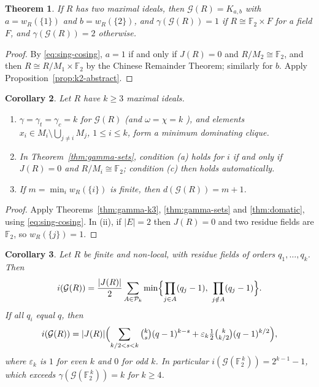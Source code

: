\documentclass[11pt]{amsart}
\newtheorem{theorem}{Theorem}[section]
\newtheorem{corollary}[theorem]{Corollary}
\theoremstyle{definition}
\theoremstyle{remark}
\newcommand{\Jac}{J}
\newcommand{\G}{\mathcal{G}}
\newcommand{\Pk}{\mathcal{P}_k}
\newcommand{\FF}{\mathbb{F}}
\newcommand{\Bool}[1]{\FF_2^{\,#1}}
\begin{document}
\begin{theorem}\label{thm:gamma-k2}
If $R$ has two maximal ideals, then $\G(R)=K_{a,b}$ with $a=w_R(\{1\})$ and $b=w_R(\{2\})$, and
$\gamma(\G(R))=1$ if $R\cong\FF_2\times F$ for a field $F$, and $\gamma(\G(R))=2$ otherwise.
\end{theorem}

\begin{proof}
By \eqref{eq:sing-cosing}, $a=1$ if and only if $\Jac(R)=0$ and $R/M_2\cong\FF_2$, and then
$R\cong R/M_1\times\FF_2$ by the Chinese Remainder Theorem; similarly for $b$. Apply Proposition~\ref{prop:k2-abstract}.
\end{proof}

\begin{corollary}\label{cor:rings-finite-max}
Let $R$ have $k\ge3$ maximal ideals.
\begin{enumerate}[label=\textup{(\roman*)}]
\item $\gamma=\gamma_t=\gamma_c=k$ for $\G(R)$ (and $\omega=\chi=k$ \cite{MP11}), and elements
  $x_i\in M_i\setminus\bigcup_{j\ne i}M_j$, $1\le i\le k$, form a minimum dominating clique.
\item In Theorem~\ref{thm:gamma-sets}, condition (a) holds for $i$ if and only if $\Jac(R)=0$ and
  $R/M_i\cong\FF_2$; condition (c) then holds automatically.
\item If $m=\min_iw_R(\{i\})$ is finite, then $d(\G(R))=m+1$.
\end{enumerate}
\end{corollary}

\begin{proof}
Apply Theorems~\ref{thm:gamma-k3}, \ref{thm:gamma-sets} and \ref{thm:domatic}, using
\eqref{eq:sing-cosing}. In (ii), if $|E|=2$ then $\Jac(R)=0$ and two residue fields are $\FF_2$, so
$w_R(\{j\})=1$.
\end{proof}

\begin{corollary}\label{cor:i-rings}
Let $R$ be finite and non-local, with residue fields of orders $q_1,\dots,q_k$. Then
\[
  i(\G(R))=\frac{|\Jac(R)|}{2}\sum_{A\in\Pk}\min\Bigl\{\prod_{j\in A}(q_j-1),\ \prod_{j\notin A}(q_j-1)\Bigr\}.
\]
If all $q_i$ equal $q$, then
\[
  i(\G(R))=|\Jac(R)|\Bigl(\sum_{k/2<s<k}\tbinom ks(q-1)^{k-s}+\varepsilon_k\tfrac12\tbinom{k}{k/2}(q-1)^{k/2}\Bigr),
\]
where $\varepsilon_k$ is $1$ for even $k$ and $0$ for odd $k$. In particular
$i(\G(\Bool k))=2^{k-1}-1$, which exceeds $\gamma(\G(\Bool k))=k$ for $k\ge4$.
\end{corollary}
\end{document}
